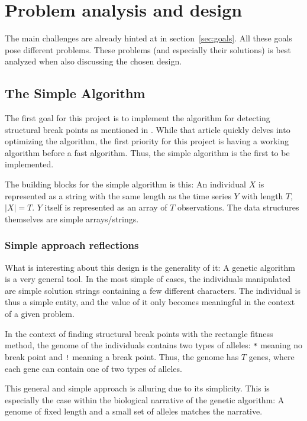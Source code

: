 
\section{Problem analysis and design} \label{sec:analysis-design} 

The main challenges are already hinted at in section~\ref{sec:goals}. All these
goals pose different problems. These problems (and especially their solutions)
is best analyzed when also discussing the chosen design.


\subsection{The Simple Algorithm} \label{sec:simple-algorithm} 

The first goal for this project is to implement the algorithm for detecting
structural break points as mentioned in \cite{doerr2017a}. While that article
quickly delves into optimizing the algorithm, the first priority for this
project is having a working algorithm before a fast algorithm. Thus, the simple
algorithm is the first to be implemented. 

The building blocks for the simple algorithm is this: An individual $X$
is represented as a string with the same length as the time series $Y$ with
length $T$, $|X| = T$. $Y$ itself is represented as an array of $T$
observations. The data structures themselves are simple arrays/strings. 

\subsubsection{Simple approach reflections} \label{sec:simple-approach-refl}

What is interesting about this design is the generality of it: A
genetic algorithm is a very general tool. In the most simple of cases, the
individuals manipulated are simple solution strings containing a few different 
characters. The individual is thus a simple entity, and the value
of it only becomes meaningful in the context of a given problem.

In the context of finding structural break points with the rectangle fitness
method, the genome of the individuals contains two types of alleles: \texttt{*}
meaning no break point and \texttt{!} meaning a break point. Thus, the genome
has $T$ genes, where each gene can contain one of two types of alleles. 

This general and simple approach is alluring due to its simplicity. This is
especially the case within the biological narrative of the genetic algorithm: A
genome of fixed length and a small set of alleles matches the narrative. 

